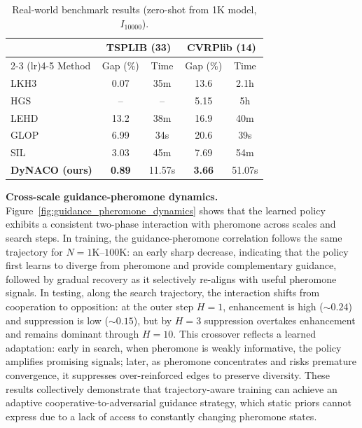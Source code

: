 \documentclass[sigconf]{acmart}
\begin{document}
\begin{table}[t]
\centering
\caption{Real-world benchmark results (zero-shot from 1K model, $I_{10000}$).}
\label{tab:realworld}
\small
\renewcommand{\arraystretch}{0.80}
\begin{tabular*}{\columnwidth}{@{\extracolsep{\fill}}lcccc@{}}
\toprule
& \multicolumn{2}{c}{TSPLIB (33)} & \multicolumn{2}{c}{CVRPlib (14)} \\
\cmidrule(lr){2-3} \cmidrule(lr){4-5}
Method & Gap (\%) & Time & Gap (\%) & Time \\
\midrule
LKH3 & 0.07 & 35m & 13.6 & 2.1h \\
HGS & -- & -- & 5.15 & 5h \\
\midrule
LEHD~\cite{lehd}  & 13.2 & 38m & 16.9 & 40m \\
GLOP~\cite{glop} & 6.99 & 34s & 20.6 & 39s \\
SIL~\cite{sil} & 3.03 & 45m & 7.69 & 54m \\
\midrule
\textbf{DyNACO (ours)}       & \textbf{0.89} & 11.57s & \textbf{3.66} & 51.07s \\
\bottomrule
\end{tabular*}
\end{table}

\smallskip\noindent\textbf{Cross-scale guidance-pheromone dynamics.} Figure~\ref{fig:guidance_pheromone_dynamics} shows that the learned policy exhibits a consistent two-phase interaction with pheromone across scales and search steps. In training, the guidance-pheromone correlation follows the same trajectory for $N{=}1$K--$100$K: an early sharp decrease, indicating that the policy first learns to diverge from pheromone and provide complementary guidance, followed by gradual recovery as it selectively re-aligns with useful pheromone signals. In testing, along the search trajectory, the interaction shifts from cooperation to opposition: at the outer step $H{=}1$, enhancement is high (${\sim}0.24$) and suppression is low (${\sim}0.15$), but by $H{=}3$ suppression overtakes enhancement and remains dominant through $H{=}10$. This crossover reflects a learned adaptation: early in search, when pheromone is weakly informative, the policy amplifies promising signals; later, as pheromone concentrates and risks premature convergence, it suppresses over-reinforced edges to preserve diversity. These results collectively demonstrate that trajectory-aware training can achieve an adaptive cooperative-to-adversarial guidance strategy, which static priors cannot express due to a lack of access to constantly changing pheromone states.
\end{document}

